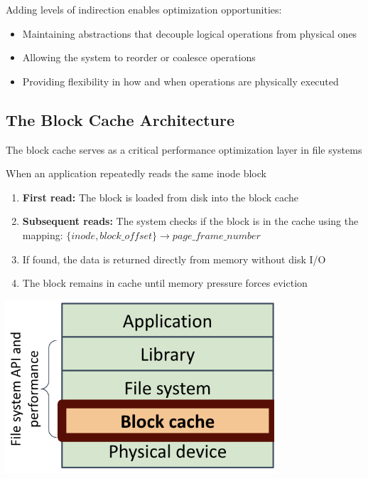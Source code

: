 \documentclass[../../compsys.tex]{subfiles}
\begin{document}
Adding levels of indirection enables optimization opportunities:
\begin{itemize}
  \item Maintaining abstractions that decouple logical operations from physical ones
  \item Allowing the system to reorder or coalesce operations
  \item Providing flexibility in how and when operations are physically executed
\end{itemize}
\newpage
\subsection{The Block Cache Architecture}
The block cache serves as a critical performance optimization layer in file systems\\[5px]

\begin{example}
\leavevmode
\upshape
\noindent When an application repeatedly reads the same inode block\\[9px]
\begin{minipage}{0.45\textwidth}
\begin{enumerate}
  \item \textbf{First read:} The block is loaded from disk into the block cache
  \item \textbf{Subsequent reads:} The system checks if the block is in the cache using the mapping:
  $\{inode, block\_offset\} \rightarrow page\_frame\_number$
  \item If found, the data is returned directly from memory without disk I/O
  \item The block remains in cache until memory pressure forces eviction
\end{enumerate}
\end{minipage}
\hfill
\vline
\hfill
\begin{minipage}{0.45\textwidth}
  \begin{center}
    \includegraphics[width=0.75\textwidth]{chapters/L7/images/layers.png}
  \end{center}
\end{minipage}
\end{example}
\newpage
\end{document}
